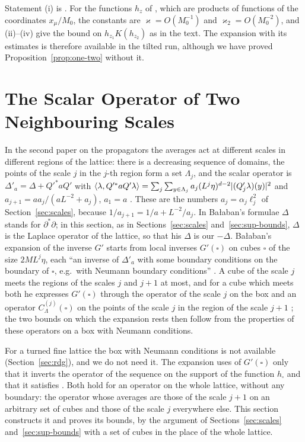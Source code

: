 \documentclass[11pt]{preprint}
\DeclarePairedDelimiter{\abs}{\lvert}{\rvert}
\numberwithin{equation}{section}
\theoremstyle{definition}
\theoremstyle{remark}
\theoremstyle{plain}
\begin{document}
Statement (i) is \cite[(1.120), (1.121)]{BalabanPRT1}. For the functions $h_z$ of \cite[(1.118)]{BalabanPRT1}, which are products of functions of the coordinates $x_\mu/M_0$, the constants are $\varkappa = O(M_0^{-1})$ and $\varkappa_2 = O(M_0^{-2})$, and (ii)--(iv) give the bound \cite[(1.128)]{BalabanPRT1} on $h_{z_1}K(h_{z_2})$ as in the text. The expansion \cite[(1.119)--(1.123)]{BalabanPRT1} with its estimates \cite[(1.124)--(1.131)]{BalabanPRT1} is therefore available in the tilted run, although we have proved Proposition~\ref{prop:one-two} without it.

\section{The Scalar Operator of Two Neighbouring Scales}\label{sec:two-scales}

In the second paper on the propagators the averages act at different scales in different regions of the lattice: there is a decreasing sequence of domains, the points of the scale $j$ in the $j$-th region form a set $\Lambda_j$, and the scalar operator is $\Delta'_a = \Delta + Q'^*aQ'$ with $\langle\lambda, Q'^*aQ'\lambda\rangle = \sum_j\sum_{y \in \Lambda_j}a_j(L^j\eta)^{d-2}\abs{(Q'_j\lambda)(y)}^2$ and $a_{j+1} = aa_j/(aL^{-2} + a_j)$, $a_1 = a$ \cite[(2.14), p.~225]{BalabanPRT2}. These are the numbers $a_j = \alpha_j\ell_j^2$ of Section~\ref{sec:scales}, because $1/a_{j+1} = 1/a + L^{-2}/a_j$. In Ba{\l}aban's formulae $\Delta$ stands for $\partial^*\partial$; in this section, as in Sections~\ref{sec:scales} and~\ref{sec:sup-bounds}, $\Delta$ is the Laplace operator of the lattice, so that his $\Delta$ is our $-\Delta$. Ba{\l}aban's expansion of the inverse $G'$ starts from local inverses $G'(\square)$ on cubes $\square$ of the size $2ML^j\eta$, each ``an inverse of $\Delta'_a$ with some boundary conditions on the boundary of $\square$, e.g.\ with Neumann boundary conditions'' \cite[(2.37), p.~229]{BalabanPRT2}. A cube of the scale $j$ meets the regions of the scales $j$ and $j + 1$ at most, and for a cube which meets both he expresses $G'(\square)$ through the operator of the scale $j$ on the box and an operator $C^{(j)}_\Lambda(\square)$ on the points of the scale $j$ in the region of the scale $j + 1$ \cite[(2.41), (2.42), p.~230]{BalabanPRT2}; the two bounds \cite[(2.43), (2.44)]{BalabanPRT2} on which the expansion rests then follow from the properties of these operators on a box with Neumann conditions.

For a turned fine lattice the box with Neumann conditions is not available (Section~\ref{sec:rdg}), and we do not need it. The expansion uses of $G'(\square)$ only that it inverts the operator of the sequence on the support of the function $h_\square$ and that it satisfies \cite[(2.43)]{BalabanPRT2}. Both hold for an operator on the whole lattice, without any boundary: the operator whose averages are those of the scale $j + 1$ on an arbitrary set of cubes and those of the scale $j$ everywhere else. This section constructs it and proves its bounds, by the argument of Sections~\ref{sec:scales} and~\ref{sec:sup-bounds} with a set of cubes in the place of the whole lattice.
\end{document}
